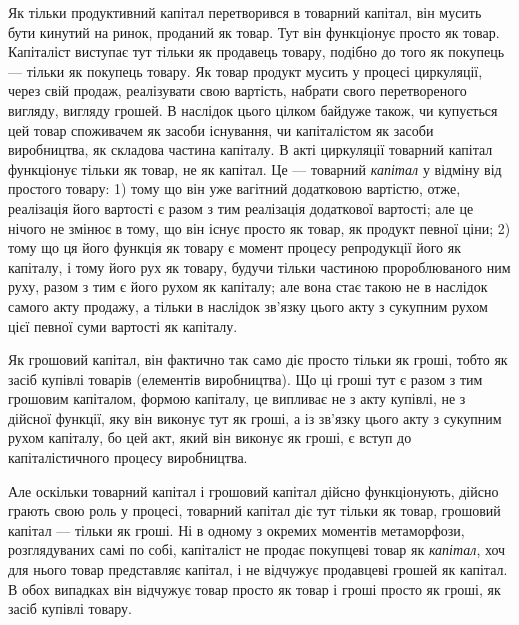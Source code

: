 
Як тільки продуктивний капітал перетворився в товарний капітал,
він мусить бути кинутий на ринок, проданий як товар.
Тут він функціонує просто як товар. Капіталіст виступає тут
тільки як продавець товару, подібно до того як покупець —
тільки як покупець товару. Як товар продукт мусить у процесі
циркуляції, через свій продаж, реалізувати свою вартість, набрати
свого перетвореного вигляду, вигляду грошей. В наслідок
цього цілком байдуже також, чи купується цей товар споживачем
як засоби існування, чи капіталістом як засоби виробництва,
як складова частина капіталу. В акті циркуляції товарний
капітал функціонує тільки як товар, не як капітал. Це — товарний \emph{капітал} у відміну від простого
товару: 1) тому що він
уже вагітний додатковою вартістю, отже, реалізація його вартості
є разом з тим реалізація додаткової вартості; але це нічого не
змінює в тому, що він існує просто як товар, як продукт певної
ціни; 2) тому що ця його функція як товару є момент процесу
репродукції його як капіталу, і тому його рух як товару,
будучи тільки частиною пророблюваного ним руху, разом з тим
є його рухом як капіталу; але вона стає такою не в наслідок
самого акту продажу, а тільки в наслідок зв’язку цього акту
з сукупним рухом цієї певної суми вартості як капіталу.

Як грошовий капітал, він фактично так само діє просто тільки
як гроші, тобто як засіб купівлі товарів (елементів виробництва).
Що ці гроші тут є разом з тим грошовим капіталом, формою капіталу,
це випливає не з акту купівлі, не з дійсної функції, яку
він виконує тут як гроші, а із зв’язку цього акту з сукупним
рухом капіталу, бо цей акт, який він виконує як гроші, є вступ
до капіталістичного процесу виробництва.

Але оскільки товарний капітал і грошовий капітал дійсно
функціонують, дійсно грають свою роль у процесі, товарний капітал
діє тут тільки як товар, грошовий капітал — тільки як гроші.
Ні в одному з окремих моментів метаморфози, розглядуваних самі
по собі, капіталіст не продає покупцеві товар як \emph{капітал}, хоч
для нього товар представляє капітал, і не відчужує продавцеві
грошей як капітал. В обох випадках він відчужує товар
просто як товар і гроші просто як гроші, як засіб купівлі
товару.

